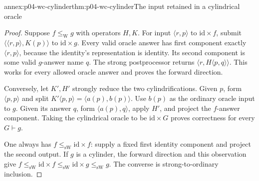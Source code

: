 \begin{annexitem}{annex:p04-wc-cylinder}{thm:p04-wc-cylinder}{The input retained in a cylindrical oracle}
\begin{proof}
Suppose \(f\leq_{\mathrm W} g\) with operators \(H,K\). For input
\(\langle r,p\rangle\) to \(\mathrm{id}\times f\), submit
\(\langle\langle r,p\rangle,K(p)\rangle\) to
\(\mathrm{id}\times g\). Every valid oracle answer has first
component exactly \(\langle r,p\rangle\), because the identity's
representation is identity. Its second component is some valid
\(g\)-answer name \(q\). The strong postprocessor returns
\(\langle r,H\langle p,q\rangle\rangle\).
This works for every allowed oracle answer and proves the forward direction.

Conversely, let \(K',H'\) strongly reduce the two cylindrifications.
Given \(p\), form \(\langle p,p\rangle\) and split
\(K'\langle p,p\rangle=\langle a(p),b(p)\rangle\).
Use \(b(p)\) as the ordinary oracle input to \(g\).
Given its answer \(q\), form \(\langle a(p),q\rangle\), apply
\(H'\), and project the \(f\)-answer component. Taking the
cylindrical oracle to be \(\mathrm{id}\times G\) proves correctness
for every \(G\vdash g\).

One always has \(f\leq_{\mathrm{sW}}\mathrm{id}\times f\): supply a fixed
first identity component and project the second output. If \(g\) is
a cylinder, the forward direction and this observation give
\(f\leq_{\mathrm{sW}}\mathrm{id}\times f
\leq_{\mathrm{sW}}\mathrm{id}\times g\leq_{\mathrm{sW}}g\).
The converse is strong-to-ordinary inclusion.
\end{proof}
\end{annexitem}

